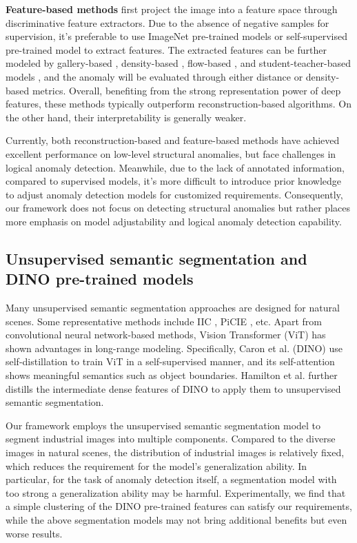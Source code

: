 \documentclass[final,5p,times,twocolumn]{elsarticle}
\begin{document}
\textbf{Feature-based methods} first project the image into a feature space through discriminative feature extractors. Due to the absence of negative samples for supervision, it's preferable to use ImageNet \cite{deng2009imagenet} pre-trained \cite{cohen2020sub} models or self-supervised \cite{li2021cutpaste} pre-trained model to extract features. The extracted features can be further modeled by gallery-based \cite{roth2022towards}, density-based \cite{rippel2021modeling}, flow-based \cite{rudolph2022fully}, and student-teacher-based models \cite{bergmann2020uninformed}, and the anomaly will be evaluated through either distance or density-based metrics. Overall, benefiting from the strong representation power of deep features, these methods typically outperform reconstruction-based algorithms. On the other hand, their interpretability is generally weaker.

Currently, both reconstruction-based and feature-based methods have achieved excellent performance on low-level structural anomalies, but face challenges in logical anomaly detection. Meanwhile, due to the lack of annotated information, compared to supervised models, it's more difficult to introduce prior knowledge to adjust anomaly detection models for customized requirements. Consequently, our framework does not focus on detecting structural anomalies but rather places more emphasis on model adjustability and logical anomaly detection capability. 



\subsection{Unsupervised semantic segmentation and DINO pre-trained models}
\label{2.3}
Many unsupervised semantic segmentation approaches are designed for natural scenes. Some representative methods include IIC \cite{ji2019invariant}, PiCIE \cite{cho2021picie}, etc. Apart from convolutional neural network-based methods, Vision Transformer (ViT) \cite{dosovitskiy2020image} has shown advantages in long-range modeling. Specifically, Caron et al. \cite{caron2021emerging} (DINO) use self-distillation to train ViT in a self-supervised manner, and its self-attention shows meaningful semantics such as object boundaries. Hamilton et al. \cite{hamilton2022unsupervised} further distills the intermediate dense features of DINO to apply them to unsupervised semantic segmentation.

Our framework employs the unsupervised semantic segmentation model to segment industrial images into multiple components. Compared to the diverse images in natural scenes, the distribution of industrial images is relatively fixed, which reduces the requirement for the model's generalization ability. In particular, for the task of anomaly detection itself, a segmentation model with too strong a generalization ability may be harmful. Experimentally, we find that a simple clustering of the DINO pre-trained features can satisfy our requirements, while the above segmentation models may not bring additional benefits but even worse results. 
\end{document}

